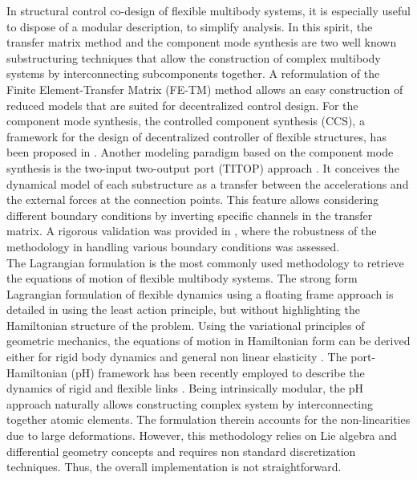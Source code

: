 In structural control co-design of flexible multibody systems, it is especially useful to dispose of a modular description, to simplify analysis. In this spirit, the transfer matrix method \cite{rong2010transfer} and the component mode synthesis \cite{hurty1965cms} are two well known substructuring techniques that allow the construction of complex multibody systems by interconnecting subcomponents together. A reformulation of the Finite Element-Transfer Matrix (FE-TM) method \cite{tan1990transfer} allows an easy construction of reduced models that are suited for decentralized control design. For the component mode synthesis, the controlled component synthesis (CCS), a framework for the design of decentralized controller of flexible structures, has been proposed in \cite{young1990}. Another modeling paradigm based on the component mode synthesis is the two-input two-output port (TITOP) approach \cite{alazard2015titop}. It conceives the dynamical model of each substructure as a transfer between the accelerations and the external forces at the connection points. This feature allows considering different boundary conditions by inverting specific channels in the transfer matrix. A rigorous validation was provided in \cite{perez2016flexible,sanfedino2018finite}, where the robustness of the methodology in handling various boundary conditions was assessed. \\

The Lagrangian formulation is the most commonly used methodology to retrieve the equations of motion of flexible multibody systems. The strong form Lagrangian formulation of flexible dynamics using a floating frame approach is detailed in  \cite[Eq. 4.10]{simeon2013computational} using the least action principle, but without highlighting the Hamiltonian structure of the problem.  Using the variational principles of geometric mechanics, the equations of motion in Hamiltonian form can be derived either for rigid body dynamics \cite[Proposition 7.1.1]{holm2008geometric} and general non linear elasticity \cite[Chapter 3]{marsden1981lectures}. The port-Hamiltonian (pH) framework \cite{duindam2009} has been recently employed to describe the dynamics of rigid and flexible links \cite{macchelli2007link,macchelli2009multi}. Being intrinsically modular, the pH approach naturally allows constructing complex system by interconnecting together atomic elements. The formulation therein accounts for the non-linearities due to large deformations.  However, this methodology relies on Lie algebra and differential geometry concepts and requires non standard discretization techniques. Thus, the overall implementation is not straightforward. \\

